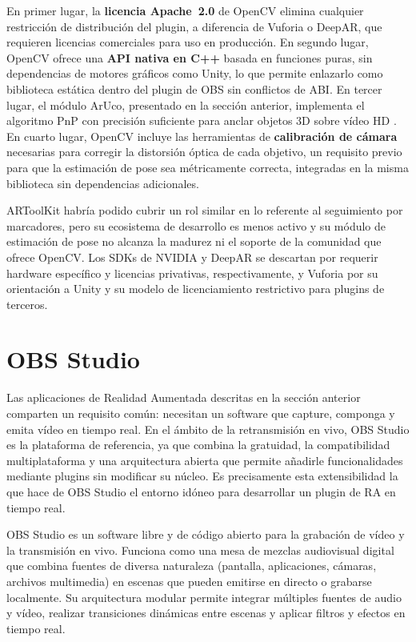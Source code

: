 En primer lugar, la \textbf{licencia Apache~2.0} de OpenCV elimina cualquier restricción de distribución del plugin, a diferencia de Vuforia o DeepAR, que requieren licencias comerciales para uso en producción. En segundo lugar, OpenCV ofrece una \textbf{API nativa en C++} basada en funciones puras, sin dependencias de motores gráficos como Unity, lo que permite enlazarlo como biblioteca estática dentro del plugin de OBS sin conflictos de ABI. En tercer lugar, el módulo ArUco, presentado en la sección anterior, implementa el algoritmo PnP con precisión suficiente para anclar objetos 3D sobre vídeo HD \citep{GarridoJurado2014}. En cuarto lugar, OpenCV incluye las herramientas de \textbf{calibración de cámara} necesarias para corregir la distorsión óptica de cada objetivo, un requisito previo para que la estimación de pose sea métricamente correcta, integradas en la misma biblioteca sin dependencias adicionales.

ARToolKit habría podido cubrir un rol similar en lo referente al seguimiento por marcadores, pero su ecosistema de desarrollo es menos activo y su módulo de estimación de pose no alcanza la madurez ni el soporte de la comunidad que ofrece OpenCV. Los SDKs de NVIDIA y DeepAR se descartan por requerir hardware específico y licencias privativas, respectivamente, y Vuforia por su orientación a Unity y su modelo de licenciamiento restrictivo para plugins de terceros.

\section{OBS Studio}
\label{sec:obs_studio}

Las aplicaciones de Realidad Aumentada descritas en la sección anterior comparten un requisito común: necesitan un software que capture, componga y emita vídeo en tiempo real. En el ámbito de la retransmisión en vivo, OBS Studio \cite{OBS} es la plataforma de referencia, ya que combina la gratuidad, la compatibilidad multiplataforma y una arquitectura abierta que permite añadirle funcionalidades mediante plugins sin modificar su núcleo. Es precisamente esta extensibilidad la que hace de OBS Studio el entorno idóneo para desarrollar un plugin de RA en tiempo real.

OBS Studio es un software libre y de código abierto para la grabación de vídeo y la transmisión en vivo. Funciona como una mesa de mezclas audiovisual digital que combina fuentes de diversa naturaleza (pantalla, aplicaciones, cámaras, archivos multimedia) en escenas que pueden emitirse en directo o grabarse localmente. Su arquitectura modular permite integrar múltiples fuentes de audio y vídeo, realizar transiciones dinámicas entre escenas y aplicar filtros y efectos en tiempo real.

